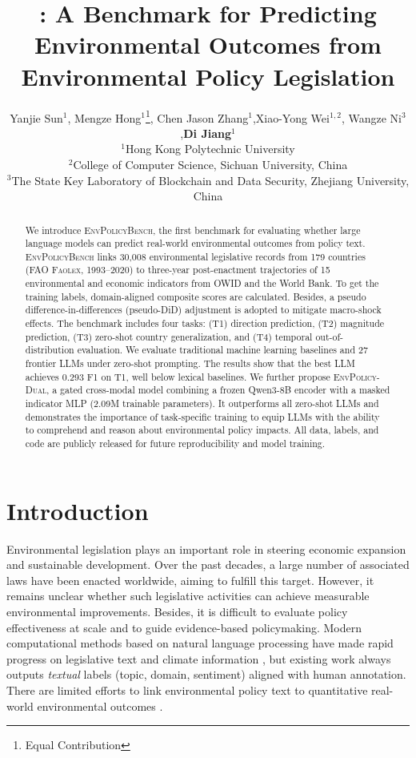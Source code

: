 \documentclass[11pt]{article}
\title{\bench: A Benchmark for Predicting Environmental Outcomes
from Environmental Policy Legislation}
\author{Yanjie Sun$^{1}$, Mengze Hong$^{1}$\thanks{Equal Contribution}, Chen Jason Zhang$^{1}$,Xiao-Yong Wei$^{1,2}$, Wangze Ni$^{3}$,\textbf{Di Jiang}$^{1}$\\ 
$^{1}$Hong Kong Polytechnic University \\ $^{2}$College of Computer Science, Sichuan University, China\\
$^{3}$The State Key Laboratory of Blockchain and Data Security, Zhejiang University, China
}
\newcommand{\ours}{\textsc{EnvPolicy-Dual}}
\newcommand{\bench}{\textsc{EnvPolicyBench}}
\begin{document}
\maketitle

\begin{abstract}
We introduce \bench, the first benchmark for evaluating whether large language models can predict real-world environmental outcomes from policy text. \bench{} links 30{,}008 environmental legislative records from 179 countries (FAO \textsc{Faolex}, 1993--2020) to three-year post-enactment trajectories of 15 environmental and economic indicators from OWID and the World Bank. To get the training labels, domain-aligned composite scores are calculated. Besides, a pseudo difference-in-differences (pseudo-DiD) adjustment is adopted to mitigate macro-shock effects. The benchmark includes four tasks: (T1) direction prediction, (T2) magnitude prediction, (T3) zero-shot country generalization, and (T4) temporal out-of-distribution evaluation. We evaluate traditional machine learning baselines and 27 frontier LLMs under zero-shot prompting. The results show that the best LLM achieves 0.293 F1 on T1, well below lexical baselines. We further propose \ours, a gated cross-modal model combining a frozen Qwen3-8B encoder with a masked indicator MLP (2.09M trainable parameters). It outperforms all zero-shot LLMs and demonstrates the importance of task-specific training to equip LLMs with the ability to comprehend and reason about environmental policy impacts. All data, labels, and code are publicly released for future  reproducibility and model training.
\end{abstract}

\section{Introduction}
\label{sec:intro}

Environmental legislation plays an important role in steering economic expansion and sustainable development.  Over the past decades, a large number of associated laws have been enacted worldwide, aiming to fulfill this target. However, it remains unclear whether such legislative activities can achieve measurable environmental improvements. Besides, it is difficult to evaluate policy effectiveness at scale and to guide evidence-based policymaking. Modern computational methods based on natural language processing have made rapid progress on legislative text \citep{chalkidis2019neural,chalkidis-etal-2022-lexglue} and climate information \citep{webersinke2022climatebert,spokoyny2023towards}, but existing work always outputs \emph{textual} labels (topic, domain, sentiment) aligned with human annotation. There are limited efforts to link environmental policy text to quantitative real-world environmental outcomes \citep{dutta2025quantifying}.
\end{document}
